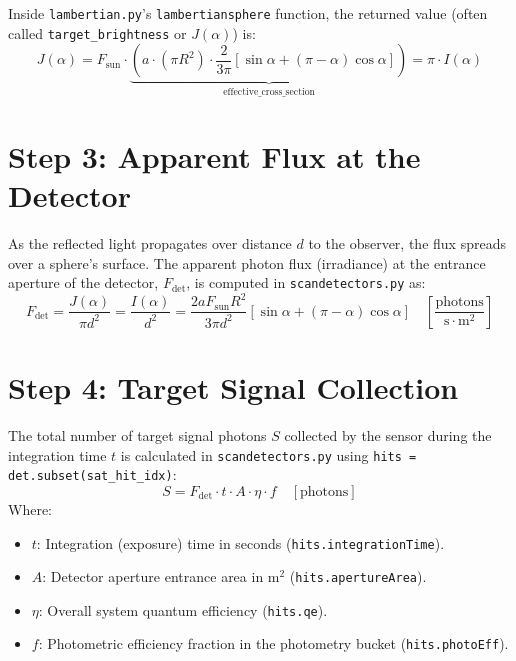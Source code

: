 \documentclass[11pt,a4paper]{article}
\begin{document}
Inside \texttt{lambertian.py}'s \texttt{lambertiansphere} function, the returned value (often called \texttt{target\_brightness} or $J(\alpha)$) is:
\begin{equation}
    J(\alpha) = F_{\text{sun}} \cdot \underbrace{\left( a \cdot (\pi R^2) \cdot \frac{2}{3\pi} \left[ \sin\alpha + (\pi - \alpha)\cos\alpha \right] \right)}_{\text{effective\_cross\_section}} = \pi \cdot I(\alpha)
\end{equation}

\section{Step 3: Apparent Flux at the Detector}
As the reflected light propagates over distance $d$ to the observer, the flux spreads over a sphere's surface. The apparent photon flux (irradiance) at the entrance aperture of the detector, $F_{\text{det}}$, is computed in \texttt{scandetectors.py} as:
\begin{equation}
    F_{\text{det}} = \frac{J(\alpha)}{\pi d^2} = \frac{I(\alpha)}{d^2} = \frac{2 a F_{\text{sun}} R^2}{3 \pi d^2} \left[ \sin\alpha + (\pi - \alpha)\cos\alpha \right] \quad \left[\frac{\text{photons}}{\text{s} \cdot \text{m}^2}\right]
\end{equation}

\section{Step 4: Target Signal Collection}
The total number of target signal photons $S$ collected by the sensor during the integration time
$t$ is calculated in \texttt{scandetectors.py} using \texttt{hits = det.subset(sat\_hit\_idx)}:
\begin{equation}
    S = F_{\text{det}} \cdot t \cdot A \cdot \eta \cdot f \quad [\text{photons}]
\end{equation}
Where:
\begin{itemize}
    \item $t$: Integration (exposure) time in seconds (\texttt{hits.integrationTime}).
    \item $A$: Detector aperture entrance area in m$^2$ (\texttt{hits.apertureArea}).
    \item $\eta$: Overall system quantum efficiency (\texttt{hits.qe}).
    \item $f$: Photometric efficiency fraction in the photometry bucket (\texttt{hits.photoEff}).
\end{itemize}
\end{document}
